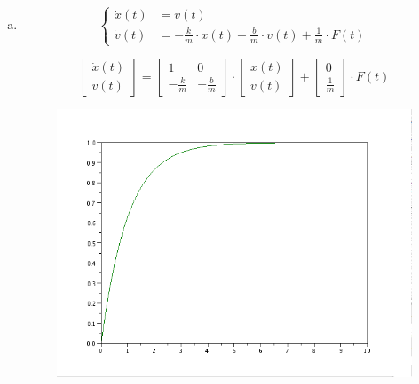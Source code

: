 \documentclass{article}
\begin{document}
\begin{itemize}
\begin{enumerate}[a)]
	\item
\begin{equation}
\left\{ \begin{array}{rl}
  \dot{x}(t) &= v(t) \\
  \dot{v}(t) &= - \frac{k}{m} \cdot x(t) - \frac{b}{m} \cdot v(t) + \frac{1}{m} \cdot F(t)
       \end{array} \right .
 \label{P1.1a} \tag{1.5}
\end{equation}

\begin{equation*}
\begin{bmatrix}
   \dot{x}(t) \\
   \dot{v}(t) 
 \end{bmatrix}
=
\begin{bmatrix}
   1 & 0 \\
  - \frac{k}{m} &  - \frac{b}{m}
\end{bmatrix} 
\cdot 
\begin{bmatrix}
   x(t) \\
   v(t) 
\end{bmatrix}
+
\begin{bmatrix}
   0 \\
\frac{1}{m}
\end{bmatrix}
\cdot
F(t)
\end{equation*}

\begin{figure}[H]
\includegraphics[width=\textwidth]{img/ej03b.png}
\caption{}
\end{figure}




\end{enumerate}
\end{itemize}
\end{document}
